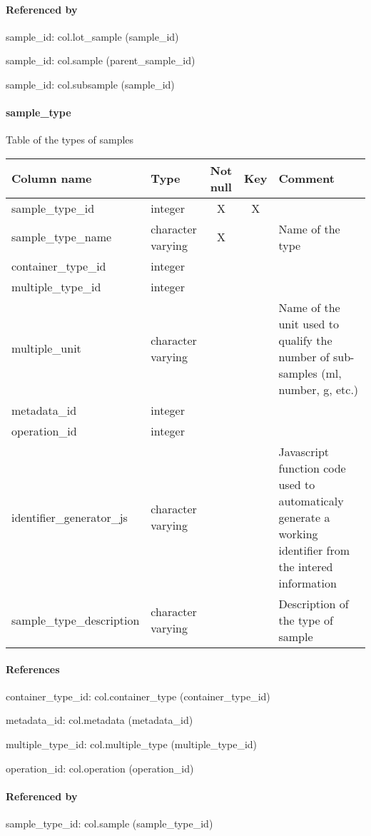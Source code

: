 \paragraph{Referenced by}
sample\_id: col.lot\_sample (sample\_id)

sample\_id: col.sample (parent\_sample\_id)

sample\_id: col.subsample (sample\_id)

\paragraph{sample\_type}
Table of the types of samples

\begin{tabular}{|l| p{2cm}|c|c| p{5cm}|}
\hline
Column name & Type & Not null & Key & Comment \\
\hline
sample\_type\_id & integer & X & X & \\
sample\_type\_name & character varying & X &  & Name of the type\\
container\_type\_id & integer &  &  & \\
multiple\_type\_id & integer &  &  & \\
multiple\_unit & character varying &  &  & Name of the unit used  to qualify the number of sub-samples (ml, number, g, etc.)\\
metadata\_id & integer &  &  & \\
operation\_id & integer &  &  & \\
identifier\_generator\_js & character varying &  &  & Javascript function code used to automaticaly generate a working identifier from the intered information\\
sample\_type\_description & character varying &  &  & Description of the type of sample\\
\hline
\end{tabular}
\paragraph{References}
container\_type\_id: col.container\_type (container\_type\_id)

metadata\_id: col.metadata (metadata\_id)

multiple\_type\_id: col.multiple\_type (multiple\_type\_id)

operation\_id: col.operation (operation\_id)

\paragraph{Referenced by}
sample\_type\_id: col.sample (sample\_type\_id)

